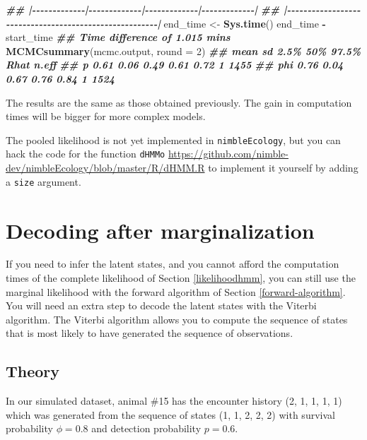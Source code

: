 \documentclass[
  12pt,
]{krantz}
\newenvironment{Shaded}{\begin{snugshade}}{\end{snugshade}}
\newcommand{\AttributeTok}[1]{\textcolor[rgb]{0.13,0.29,0.53}{#1}}
\newcommand{\DecValTok}[1]{\textcolor[rgb]{0.00,0.00,0.81}{#1}}
\newcommand{\DocumentationTok}[1]{\textcolor[rgb]{0.56,0.35,0.01}{\textbf{\textit{#1}}}}
\newcommand{\FunctionTok}[1]{\textcolor[rgb]{0.13,0.29,0.53}{\textbf{#1}}}
\newcommand{\NormalTok}[1]{#1}
\newcommand{\OtherTok}[1]{\textcolor[rgb]{0.56,0.35,0.01}{#1}}
\newcommand{\SpecialCharTok}[1]{\textcolor[rgb]{0.81,0.36,0.00}{\textbf{#1}}}
\begin{document}
\begin{Shaded}
\begin{Highlighting}[]
\DocumentationTok{\#\# |{-}{-}{-}{-}{-}{-}{-}{-}{-}{-}{-}{-}{-}|{-}{-}{-}{-}{-}{-}{-}{-}{-}{-}{-}{-}{-}|{-}{-}{-}{-}{-}{-}{-}{-}{-}{-}{-}{-}{-}|{-}{-}{-}{-}{-}{-}{-}{-}{-}{-}{-}{-}{-}|}
\DocumentationTok{\#\# |{-}{-}{-}{-}{-}{-}{-}{-}{-}{-}{-}{-}{-}{-}{-}{-}{-}{-}{-}{-}{-}{-}{-}{-}{-}{-}{-}{-}{-}{-}{-}{-}{-}{-}{-}{-}{-}{-}{-}{-}{-}{-}{-}{-}{-}{-}{-}{-}{-}{-}{-}{-}{-}{-}{-}|}
\NormalTok{end\_time }\OtherTok{\textless{}{-}} \FunctionTok{Sys.time}\NormalTok{()}
\NormalTok{end\_time }\SpecialCharTok{{-}}\NormalTok{ start\_time}
\DocumentationTok{\#\# Time difference of 1.015 mins}
\FunctionTok{MCMCsummary}\NormalTok{(mcmc.output, }\AttributeTok{round =} \DecValTok{2}\NormalTok{)}
\DocumentationTok{\#\#     mean   sd 2.5\%  50\% 97.5\% Rhat n.eff}
\DocumentationTok{\#\# p   0.61 0.06 0.49 0.61  0.72    1  1455}
\DocumentationTok{\#\# phi 0.76 0.04 0.67 0.76  0.84    1  1524}
\end{Highlighting}
\end{Shaded}

The results are the same as those obtained previously. The gain in computation times will be bigger for more complex models.

The pooled likelihood is not yet implemented in \texttt{nimbleEcology}, but you can hack the code for the function \texttt{dHMMo} \url{https://github.com/nimble-dev/nimbleEcology/blob/master/R/dHMM.R} to implement it yourself by adding a \texttt{size} argument.

\section{Decoding after marginalization}\label{decoding}

If you need to infer the latent states, and you cannot afford the computation times of the complete likelihood of Section \ref{likelihoodhmm}, you can still use the marginal likelihood with the forward algorithm of Section \ref{forward-algorithm}. You will need an extra step to decode the latent states with the Viterbi algorithm. The Viterbi algorithm allows you to compute the sequence of states that is most likely to have generated the sequence of observations.

\subsection{Theory}\label{viterbi-theory}

In our simulated dataset, animal \#15 has the encounter history (2, 1, 1, 1, 1) which was generated from the sequence of states (1, 1, 2, 2, 2) with survival probability \(\phi = 0.8\) and detection probability \(p = 0.6\).
\end{document}
